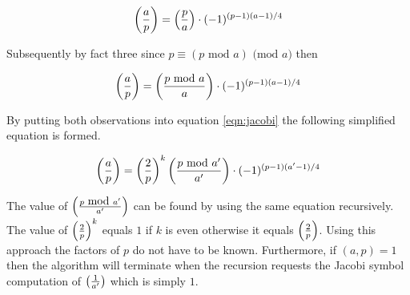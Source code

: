 \documentclass[b5paper]{book}
\begin{document}
\begin{equation}
\left ( { a \over p } \right ) = \left ( { p \over a } \right ) \cdot (-1)^{(p-1)(a-1)/4} 
\end{equation}

Subsequently by fact three since $p \equiv (p \mbox{ mod }a) \mbox{ (mod }a\mbox{)}$ then 

\begin{equation}
\left ( { a \over p } \right ) = \left ( { {p \mbox{ mod } a} \over a } \right ) \cdot (-1)^{(p-1)(a-1)/4} 
\end{equation}

By putting both observations into equation \ref{eqn:jacobi} the following simplified equation is formed.

\begin{equation}
\left ( { a \over p } \right ) = \left ( {2 \over p } \right )^k \left ( {{p\mbox{ mod }a'} \over a'} \right )  \cdot (-1)^{(p-1)(a'-1)/4} 
\end{equation}

The value of $\left ( {{p \mbox{ mod }a'} \over a'} \right )$ can be found by using the same equation recursively.  The value of 
$\left ( {2 \over p } \right )^k$ equals $1$ if $k$ is even otherwise it equals $\left ( {2 \over p } \right )$.  Using this approach the 
factors of $p$ do not have to be known.  Furthermore, if $(a, p) = 1$ then the algorithm will terminate when the recursion requests the 
Jacobi symbol computation of $\left ( {1 \over a'} \right )$ which is simply $1$.  
\end{document}
